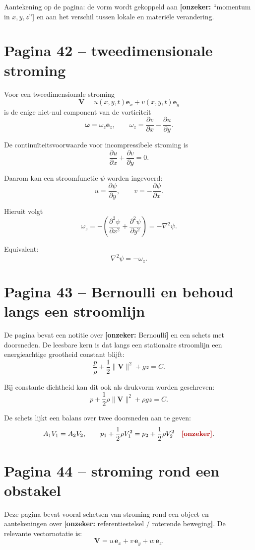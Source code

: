 \documentclass[11pt,a4paper]{article}
\newcommand{\onzeker}[1]{\ifmmode\text{\color{red!70!black}\bfseries[onzeker]}\else\textcolor{red!70!black}{\textbf{[onzeker:} #1\textbf{]}}\fi}
\newcommand{\grad}{\nabla}
\newcommand{\V}{\mathbf{V}}
\newcommand{\omegav}{\bm{\omega}}
\begin{document}
Aantekening op de pagina: de vorm wordt gekoppeld aan \onzeker{``momentum in $x,y,z$''} en aan het verschil tussen lokale en materiële verandering.

\section*{Pagina 42 -- tweedimensionale stroming}

Voor een tweedimensionale stroming
$$
\V = u\left(x,y,t\right)\mathbf{e}_x + v\left(x,y,t\right)\mathbf{e}_y
$$
is de enige niet-nul component van de vorticiteit
$$
\omegav = \omega_z \mathbf{e}_z,
\qquad
\omega_z =
\frac{\partial v}{\partial x}
-
\frac{\partial u}{\partial y}.
$$

De continuïteitsvoorwaarde voor incompressibele stroming is
$$
\frac{\partial u}{\partial x}
+
\frac{\partial v}{\partial y}
=0.
$$

Daarom kan een stroomfunctie $\psi$ worden ingevoerd:
$$
u = \frac{\partial \psi}{\partial y},
\qquad
v = -\frac{\partial \psi}{\partial x}.
$$

Hieruit volgt
$$
\omega_z
=
-\left(
\frac{\partial^2 \psi}{\partial x^2}
+
\frac{\partial^2 \psi}{\partial y^2}
\right)
=
-\grad^2\psi.
$$

Equivalent:
$$
\grad^2\psi = -\omega_z.
$$

\section*{Pagina 43 -- Bernoulli en behoud langs een stroomlijn}

De pagina bevat een notitie over \onzeker{Bernoulli} en een schets met doorsneden. De leesbare kern is dat langs een stationaire stroomlijn een energieachtige grootheid constant blijft:
$$
\frac{p}{\rho}
+
\frac{1}{2}\lVert\V\rVert^2
+
gz
=
C.
$$

Bij constante dichtheid kan dit ook als drukvorm worden geschreven:
$$
p
+
\frac{1}{2}\rho \lVert\V\rVert^2
+
\rho gz
=
C.
$$

De schets lijkt een balans over twee doorsneden aan te geven:
$$
A_1 V_1 = A_2 V_2,
\qquad
p_1+\frac{1}{2}\rho V_1^2
=
p_2+\frac{1}{2}\rho V_2^2
\quad
\onzeker{zonder hoogteverschil}.
$$

\section*{Pagina 44 -- stroming rond een obstakel}

Deze pagina bevat vooral schetsen van stroming rond een object en aantekeningen over \onzeker{referentiestelsel / roterende beweging}. De relevante vectornotatie is:
$$
\V =
u\,\mathbf{e}_x + v\,\mathbf{e}_y + w\,\mathbf{e}_z.
$$
\end{document}
